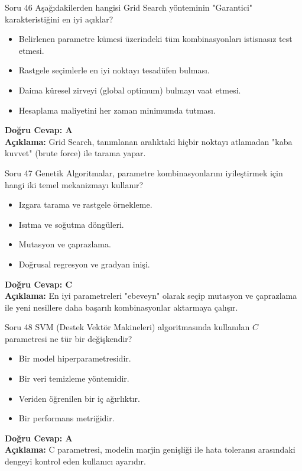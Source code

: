 \documentclass[12pt,a4paper]{article}
\begin{document}
\begin{testcard}{Soru 46}
    Aşağıdakilerden hangisi Grid Search yönteminin "Garantici" karakteristiğini en iyi açıklar?
    \begin{itemize}
        \item[A)] Belirlenen parametre kümesi üzerindeki tüm kombinasyonları istisnasız test etmesi.
        \item[B)] Rastgele seçimlerle en iyi noktayı tesadüfen bulması.
        \item[C)] Daima küresel zirveyi (global optimum) bulmayı vaat etmesi.
        \item[D)] Hesaplama maliyetini her zaman minimumda tutması.
    \end{itemize}
    \tcblower
    \textbf{Doğru Cevap: A} \\
    \textbf{Açıklama:} Grid Search, tanımlanan aralıktaki hiçbir noktayı atlamadan "kaba kuvvet" (brute force) ile tarama yapar.
\end{testcard}

\begin{testcard}{Soru 47}
    Genetik Algoritmalar, parametre kombinasyonlarını iyileştirmek için hangi iki temel mekanizmayı kullanır?
    \begin{itemize}
        \item[A)] Izgara tarama ve rastgele örnekleme.
        \item[B)] Isıtma ve soğutma döngüleri.
        \item[C)] Mutasyon ve çaprazlama.
        \item[D)] Doğrusal regresyon ve gradyan inişi.
    \end{itemize}
    \tcblower
    \textbf{Doğru Cevap: C} \\
    \textbf{Açıklama:} En iyi parametreleri "ebeveyn" olarak seçip mutasyon ve çaprazlama ile yeni nesillere daha başarılı kombinasyonlar aktarmaya çalışır.
\end{testcard}

\begin{testcard}{Soru 48}
    SVM (Destek Vektör Makineleri) algoritmasında kullanılan $C$ parametresi ne tür bir değişkendir?
    \begin{itemize}
        \item[A)] Bir model hiperparametresidir.
        \item[B)] Bir veri temizleme yöntemidir.
        \item[C)] Veriden öğrenilen bir iç ağırlıktır.
        \item[D)] Bir performans metriğidir.
    \end{itemize}
    \tcblower
    \textbf{Doğru Cevap: A} \\
    \textbf{Açıklama:} C parametresi, modelin marjin genişliği ile hata toleransı arasındaki dengeyi kontrol eden kullanıcı ayarıdır.
\end{testcard}
\end{document}
